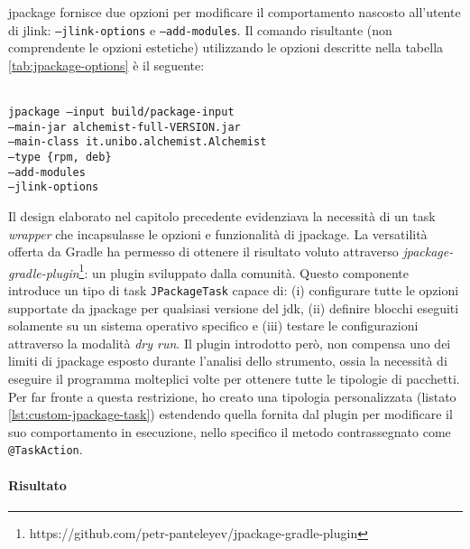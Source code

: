 jpackage fornisce due opzioni per modificare il comportamento nascosto all'utente di jlink: \texttt{--jlink-options} e \texttt{--add-modules}. Il comando risultante (non comprendente le opzioni estetiche) utilizzando le opzioni descritte nella tabella \ref{tab:jpackage-options} è il seguente:

\texttt{\\ jpackage --input build/package-input \\ \tab\tab --main-jar alchemist-full-VERSION.jar \\ \tab\tab --main-class it.unibo.alchemist.Alchemist \\ \tab\tab --type \{rpm, deb\} \\ \tab\tab --add-modules \\ \tab\tab --jlink-options \\}


Il design elaborato nel capitolo precedente evidenziava la necessità di un task \textit{wrapper} che incapsulasse le opzioni e funzionalità di jpackage. La versatilità offerta da Gradle ha permesso di ottenere il risultato voluto attraverso \textit{jpackage-gradle-plugin}\footnote{https://github.com/petr-panteleyev/jpackage-gradle-plugin}: un plugin sviluppato dalla comunità. Questo componente introduce un tipo di task \texttt{JPackageTask} capace di: (i) configurare tutte le opzioni supportate da jpackage per qualsiasi versione del \ac{jdk}, (ii) definire blocchi eseguiti solamente su un sistema operativo specifico e (iii) testare le configurazioni attraverso la modalità \textit{dry run}. Il plugin introdotto però, non compensa uno dei limiti di jpackage esposto durante l'analisi dello strumento, ossia la necessità di eseguire il programma molteplici volte per ottenere tutte le tipologie di pacchetti. Per far fronte a questa restrizione, ho creato una tipologia personalizzata (listato \ref{lst:custom-jpackage-task}) estendendo quella fornita dal plugin per modificare il suo comportamento in esecuzione, nello specifico il metodo contrassegnato come \texttt{@TaskAction}.



\paragraph{Risultato}

